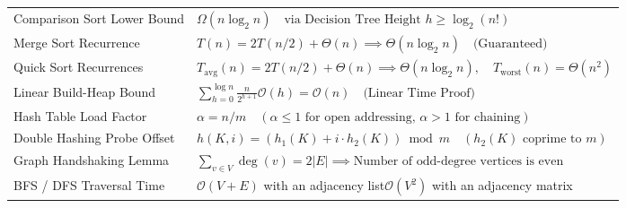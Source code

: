 \documentclass[12pt,a4paper]{article}
\renewcommand{\arraystretch}{1.45}
\begin{document}
\begin{tcolorbox}[formulabox, title={\textbf{Key Formulas, Recurrences and Complexities at a Glance}}]
\renewcommand{\arraystretch}{1.25}
\begin{tabularx}{\linewidth}{B{4.3cm} Y}
Comparison Sort Lower Bound & $\Omega(n \log_2 n) \quad \text{via Decision Tree Height } h \ge \log_2(n!)$ \\[2pt]
Merge Sort Recurrence & $T(n) = 2T(n/2) + \Theta(n) \implies \Theta(n \log_2 n) \quad \text{(Guaranteed)}$ \\[2pt]
Quick Sort Recurrences & $T_{\text{avg}}(n) = 2T(n/2) + \Theta(n) \implies \Theta(n \log_2 n), \quad T_{\text{worst}}(n) = \Theta(n^2)$ \\[2pt]
Linear Build-Heap Bound & $\sum_{h=0}^{\log n} \frac{n}{2^{h+1}} \mathcal{O}(h) = \mathcal{O}(n) \quad \text{(Linear Time Proof)}$ \\[2pt]
Hash Table Load Factor & $\alpha = n / m \quad (\alpha \le 1 \text{ for open addressing, } \alpha > 1 \text{ for chaining})$ \\[2pt]
Double Hashing Probe Offset & $h(K, i) = (h_1(K) + i \cdot h_2(K)) \bmod m \quad (h_2(K) \text{ coprime to } m)$ \\[2pt]
Graph Handshaking Lemma & $\sum_{v \in V} \deg(v) = 2 |E| \implies \text{Number of odd-degree vertices is even}$ \\[2pt]
BFS / DFS Traversal Time & $\mathcal{O}(V + E)$ with an adjacency list\newline $\mathcal{O}(V^2)$ with an adjacency matrix \\[2pt]
\end{tabularx}
\end{tcolorbox}
\end{document}
